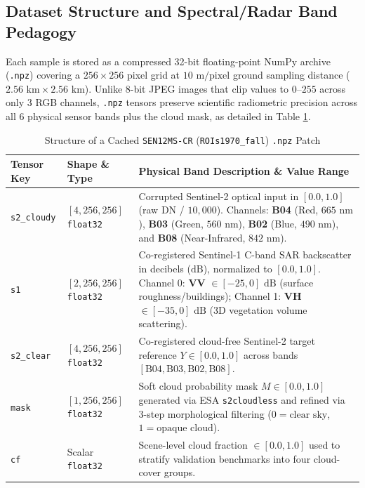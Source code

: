 \documentclass[12pt,a4paper]{report}
\begin{document}
\subsection{Dataset Structure and Spectral/Radar Band Pedagogy}
Each sample is stored as a compressed 32-bit floating-point NumPy archive (\texttt{.npz}) covering a $256\times 256$ pixel grid at $10\text{ m/pixel}$ ground sampling distance ($2.56\text{ km}\times 2.56\text{ km}$). Unlike 8-bit JPEG images that clip values to $0$--$255$ across only 3 RGB channels, \texttt{.npz} tensors preserve scientific radiometric precision across all 6 physical sensor bands plus the cloud mask, as detailed in Table \ref{tab:dataset_structure}.

\begin{table}[htbp]
\centering
\caption{Structure of a Cached \texttt{SEN12MS-CR} (\texttt{ROIs1970\_fall}) \texttt{.npz} Patch}
\label{tab:dataset_structure}
\renewcommand{\arraystretch}{1.35}
\begin{tabular}{|p{2.3cm}|p{2.6cm}|p{9.2cm}|}
\hline
\textbf{Tensor Key} & \textbf{Shape \& Type} & \textbf{Physical Band Description \& Value Range} \\
\hline
\texttt{s2\_cloudy} & $[4, 256, 256]$ \texttt{float32} & Corrupted Sentinel-2 optical input in $[0.0, 1.0]$ (raw DN / $10{,}000$). Channels: \textbf{B04} (Red, $665\text{ nm}$), \textbf{B03} (Green, $560\text{ nm}$), \textbf{B02} (Blue, $490\text{ nm}$), and \textbf{B08} (Near-Infrared, $842\text{ nm}$). \\
\hline
\texttt{s1} & $[2, 256, 256]$ \texttt{float32} & Co-registered Sentinel-1 C-band SAR backscatter in decibels ($\text{dB}$), normalized to $[0.0, 1.0]$. Channel 0: \textbf{VV} $\in [-25, 0]\text{ dB}$ (surface roughness/buildings); Channel 1: \textbf{VH} $\in [-35, 0]\text{ dB}$ (3D vegetation volume scattering). \\
\hline
\texttt{s2\_clear} & $[4, 256, 256]$ \texttt{float32} & Co-registered cloud-free Sentinel-2 target reference $Y \in [0.0, 1.0]$ across bands $[\text{B04}, \text{B03}, \text{B02}, \text{B08}]$. \\
\hline
\texttt{mask} & $[1, 256, 256]$ \texttt{float32} & Soft cloud probability mask $M \in [0.0, 1.0]$ generated via ESA \texttt{s2cloudless} and refined via 3-step morphological filtering ($0 = \text{clear sky}$, $1 = \text{opaque cloud}$). \\
\hline
\texttt{cf} & Scalar \texttt{float32} & Scene-level cloud fraction $\in [0.0, 1.0]$ used to stratify validation benchmarks into four cloud-cover groups. \\
\hline
\end{tabular}
\end{table}
\end{document}
